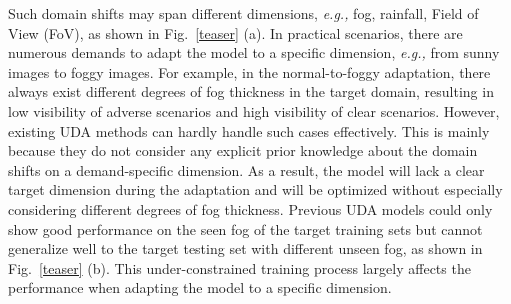 \documentclass[10pt,journal,compsoc]{IEEEtran}
\begin{document}
\begin{table*}{}
\caption{Comparisons of several related settings of UDA, Prior DA, Cross-FOV DA, DG, and Ours (SDA). }
\centering
\label{table-setting}
\end{table*}
Such domain shifts may span different dimensions, \emph{e.g.,} fog, rainfall, Field of View (FoV), as shown in Fig.~\ref{teaser} (a).
In practical scenarios, there are numerous demands to adapt the model to a specific dimension, \emph{e.g.,} from sunny images to foggy images. For example, in the normal-to-foggy adaptation, there always exist different degrees of fog thickness in the target domain, resulting in low visibility of adverse scenarios and high visibility of clear scenarios. 
However, existing UDA methods can hardly handle such cases effectively. This is mainly because they do not consider any explicit prior knowledge about the domain shifts on a demand-specific dimension. As a result, the model will lack a clear target dimension during the adaptation and will be optimized without especially considering different degrees of fog thickness. Previous UDA models could only show good performance on the seen fog of the target training sets but cannot generalize well to the target testing set with different unseen fog, as shown in Fig.~\ref{teaser} (b). 
This under-constrained training process largely affects the performance when adapting the model to a specific dimension. 
\end{document}
